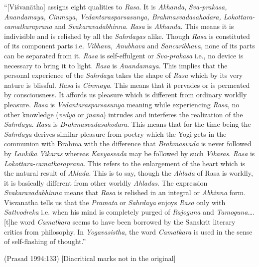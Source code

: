 \begin{myquote}
“[Viśvanātha] assigns eight qualities to \textsl{Rasa}. It is \textsl{Akhanda}, \textsl{Sva-prakasa, Anandamaya, Cinmaya, Vedantarasparsasunya, Brahmasvadasahodara, Loko\-ttara-camatkaraprana} and \textsl{Svakaravadabhinna}. \textsl{Rasa} is \textsl{Akhanda}. This means it is indivisible and is relished by all the \textsl{Sahrdayas} alike. Though \textsl{Rasa} is constituted of its component parts i.e. \textsl{Vibhava, Anubhava} and \textsl{Sancaribhava}, none of its parts can be separated from it. \textsl{Rasa} is self-effulgent or \textsl{Sva-prakasa} i.e., no device is necessary to bring it to light. \textsl{Rasa }is\textsl{ Anandamaya}. This implies that the personal experience of the \textsl{Sahrdaya} takes the shape of \textsl{Rasa} which by its very nature is blissful. \textsl{Rasa} is \textsl{Cinmaya}. This means that it pervades or is permeated by consciousness. It affords us pleasure which is different from ordinary worldly pleasure. \textsl{Rasa} is \textsl{Vedantarasparsasunya} meaning while experiencing \textsl{Rasa}, no other knowledge (\textsl{vedya} or \textsl{jnana}) intrudes and interferes the realization of the \textsl{Sahrdaya}. \textsl{Rasa} is \textsl{Brahmasvadasahodara}. This means that for the time being the \textsl{Sahrdaya} derives similar pleasure from poetry which the Yogi gets in the communion with Brahma with the difference that \textsl{Brahmasvada} is never followed by \textsl{Laukika Vikaras} whereas \textsl{Kavyasvada} may be followed by such \textsl{Vikaras}. \textsl{Rasa} is \textsl{Lokottara-camatkaraprana}. This refers to the enlargement of the heart which is the natural result of \textsl{Ahlada}. This is to say, though the \textsl{Ahlada} of Rasa is worldly, it is basically different from other worldly \textsl{Ahladas}. The expression \textsl{Svakaravadabhinna} means that \textsl{Rasa} is relished in an integral or \textsl{Abhinna} form. Visvanatha tells us that the \textsl{Pramata} or \textsl{Sahrdaya} enjoys \textsl{Rasa} only with \textsl{Sattvodreka} i.e. when his mind is completely purged of \textsl{Rajoguna} and \textsl{Tamoguna}….[t]he word \textsl{Camatkara} seems to have been borrowed by the Sanskrit literary critics from philosophy. In \textsl{Yogavasistha}, the word \textsl{Camatkara} is used in the sense of self-flashing of thought.” 

\hfill (Prasad 1994:133) [Diacritical marks not in the original]
\end{myquote}

